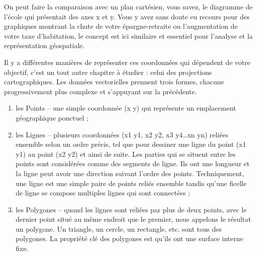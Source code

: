 On peut faire la comparaison avec un plan cartésien, vous savez, le diagramme de l'école qui présentait des axes x et y. Vous y avez sans doute eu recours pour des graphiques montrant la chute de votre épargne-retraite ou l'augmentation de votre taxe d'habitation, le concept est ici similaire et essentiel pour l'analyse et la représentation géospatiale.

Il y a différentes manières de représenter ces coordonnées qui dépendent de votre objectif, c'est un tout autre chapitre à étudier : celui des projections cartographiques.
Les données vectorielles prennent trois formes, chacune progressivement plus complexe et s'appuyant sur la précédente.  

\begin{enumerate} 
\item les Points -- une simple coordonnée (x y) qui représente un emplacement géographique ponctuel ;
\item les Lignes -- plusieurs coordonnées (x1 y1, x2 y2, x3 y4\dots xn yn) reliées ensemble selon un ordre précis, tel que pour dessiner une ligne du point (x1 y1) au point (x2 y2) et ainsi de suite. Les parties qui se situent entre les points sont considérées comme des segments de ligne. Ils ont une longueur et la ligne peut avoir une direction suivant l'ordre des points. Techniquement, une ligne est une simple paire de points reliés ensemble tandis qu'une ficelle de ligne se compose multiples lignes qui sont connectées ;
\item les Polygones -- quand les lignes sont reliées par plus de deux points, avec le dernier point situé au même endroit que le premier, nous appelons le résultat un polygone. Un triangle, un cercle, un rectangle, etc. sont tous des polygones. La propriété clé des polygones est qu'ils ont une surface interne fixe.
\end{enumerate}
